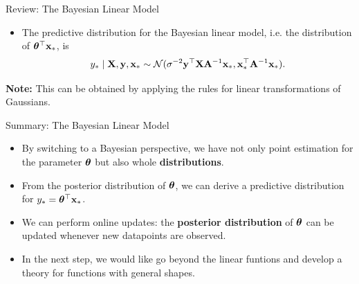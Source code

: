 \begin{frame}[c, allowframebreaks]{Review: The Bayesian Linear Model}
\begin{itemize}
\lz

\item The predictive distribution for the Bayesian linear model, i.e. the distribution of $\bm{\theta}^\top \mathbf{x}_*$, is
$$y_* \mid \mathbf{X}, \mathbf{y}, \mathbf{x}_* \sim \mathcal{N}(\sigma^{-2}\mathbf{y}^\top \mathbf{X} \mathbf{A}^{-1}\mathbf{x}_*, \mathbf{x}_*^\top\mathbf{A}^{-1}\mathbf{x}_*).$$
\end{itemize}

\lz

\textbf{Note:} This can be obtained by applying the rules for linear transformations of Gaussians.

\framebreak


\end{frame}


\begin{frame}[c]{Summary: The Bayesian Linear Model}

\begin{itemize}
  \item By switching to a Bayesian perspective, we have not only point estimation for the parameter $\bm{\theta}$ but also whole \textbf{distributions}.
  \lz
  \item From the posterior distribution of $\bm{\theta}$, we can derive a predictive distribution for $y_* = \bm{\theta}^\top \mathbf{x}_*$.  
  \lz
  \item We can perform online updates: the \textbf{posterior distribution} of $\bm{\theta}$ can be updated whenever new datapoints are observed. 
\lz
\item In the next step, we would like go beyond the linear funtions and develop a theory for functions with general shapes.
\end{itemize}

\end{frame}


